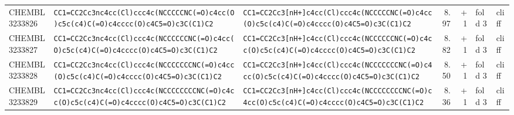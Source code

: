 \begin{longtable}{l p{4.4cm} p{4.4cm} r r l l}
CHEMBL3233826 & \texttt{CC1=\allowbreak{}CC2Cc3nc4cc(\allowbreak{}Cl)\allowbreak{}ccc4c(\allowbreak{}NCCCCCNC(\allowbreak{}=\allowbreak{}O)\allowbreak{}c4cc(\allowbreak{}O)\allowbreak{}c5c(\allowbreak{}c4)\allowbreak{}C(\allowbreak{}=\allowbreak{}O)\allowbreak{}c4cccc(\allowbreak{}O)\allowbreak{}c4C5=\allowbreak{}O)\allowbreak{}c3C(\allowbreak{}C1)\allowbreak{}C2} & \texttt{CC1=\allowbreak{}CC2Cc3[nH+]\allowbreak{}c4cc(\allowbreak{}Cl)\allowbreak{}ccc4c(\allowbreak{}NCCCCCNC(\allowbreak{}=\allowbreak{}O)\allowbreak{}c4cc(\allowbreak{}O)\allowbreak{}c5c(\allowbreak{}c4)\allowbreak{}C(\allowbreak{}=\allowbreak{}O)\allowbreak{}c4cccc(\allowbreak{}O)\allowbreak{}c4C5=\allowbreak{}O)\allowbreak{}c3C(\allowbreak{}C1)\allowbreak{}C2} & 8.97 & +1 & fold 3 & cliff \\
CHEMBL3233827 & \texttt{CC1=\allowbreak{}CC2Cc3nc4cc(\allowbreak{}Cl)\allowbreak{}ccc4c(\allowbreak{}NCCCCCCNC(\allowbreak{}=\allowbreak{}O)\allowbreak{}c4cc(\allowbreak{}O)\allowbreak{}c5c(\allowbreak{}c4)\allowbreak{}C(\allowbreak{}=\allowbreak{}O)\allowbreak{}c4cccc(\allowbreak{}O)\allowbreak{}c4C5=\allowbreak{}O)\allowbreak{}c3C(\allowbreak{}C1)\allowbreak{}C2} & \texttt{CC1=\allowbreak{}CC2Cc3[nH+]\allowbreak{}c4cc(\allowbreak{}Cl)\allowbreak{}ccc4c(\allowbreak{}NCCCCCCNC(\allowbreak{}=\allowbreak{}O)\allowbreak{}c4cc(\allowbreak{}O)\allowbreak{}c5c(\allowbreak{}c4)\allowbreak{}C(\allowbreak{}=\allowbreak{}O)\allowbreak{}c4cccc(\allowbreak{}O)\allowbreak{}c4C5=\allowbreak{}O)\allowbreak{}c3C(\allowbreak{}C1)\allowbreak{}C2} & 8.82 & +1 & fold 3 & cliff \\
CHEMBL3233828 & \texttt{CC1=\allowbreak{}CC2Cc3nc4cc(\allowbreak{}Cl)\allowbreak{}ccc4c(\allowbreak{}NCCCCCCCNC(\allowbreak{}=\allowbreak{}O)\allowbreak{}c4cc(\allowbreak{}O)\allowbreak{}c5c(\allowbreak{}c4)\allowbreak{}C(\allowbreak{}=\allowbreak{}O)\allowbreak{}c4cccc(\allowbreak{}O)\allowbreak{}c4C5=\allowbreak{}O)\allowbreak{}c3C(\allowbreak{}C1)\allowbreak{}C2} & \texttt{CC1=\allowbreak{}CC2Cc3[nH+]\allowbreak{}c4cc(\allowbreak{}Cl)\allowbreak{}ccc4c(\allowbreak{}NCCCCCCCNC(\allowbreak{}=\allowbreak{}O)\allowbreak{}c4cc(\allowbreak{}O)\allowbreak{}c5c(\allowbreak{}c4)\allowbreak{}C(\allowbreak{}=\allowbreak{}O)\allowbreak{}c4cccc(\allowbreak{}O)\allowbreak{}c4C5=\allowbreak{}O)\allowbreak{}c3C(\allowbreak{}C1)\allowbreak{}C2} & 8.50 & +1 & fold 3 & cliff \\
CHEMBL3233829 & \texttt{CC1=\allowbreak{}CC2Cc3nc4cc(\allowbreak{}Cl)\allowbreak{}ccc4c(\allowbreak{}NCCCCCCCCNC(\allowbreak{}=\allowbreak{}O)\allowbreak{}c4cc(\allowbreak{}O)\allowbreak{}c5c(\allowbreak{}c4)\allowbreak{}C(\allowbreak{}=\allowbreak{}O)\allowbreak{}c4cccc(\allowbreak{}O)\allowbreak{}c4C5=\allowbreak{}O)\allowbreak{}c3C(\allowbreak{}C1)\allowbreak{}C2} & \texttt{CC1=\allowbreak{}CC2Cc3[nH+]\allowbreak{}c4cc(\allowbreak{}Cl)\allowbreak{}ccc4c(\allowbreak{}NCCCCCCCCNC(\allowbreak{}=\allowbreak{}O)\allowbreak{}c4cc(\allowbreak{}O)\allowbreak{}c5c(\allowbreak{}c4)\allowbreak{}C(\allowbreak{}=\allowbreak{}O)\allowbreak{}c4cccc(\allowbreak{}O)\allowbreak{}c4C5=\allowbreak{}O)\allowbreak{}c3C(\allowbreak{}C1)\allowbreak{}C2} & 8.36 & +1 & fold 3 & cliff \\

\end{longtable}

